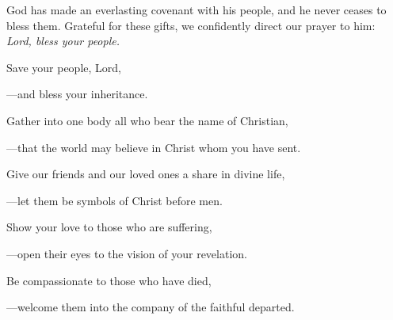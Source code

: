\intercessions\indent

\begin{hangpar}

God has made an everlasting covenant with his people, and he never ceases to bless them. Grateful for these gifts, we confidently direct our prayer to him:\\
\emph{Lord, bless your people.}

\medskip Save your people, Lord,

{\color{red}---\thinspace}and bless your inheritance.

\medskip Gather into one body all who bear the name of Christian,

{\color{red}---\thinspace}that the world may believe in Christ whom you have sent.

\medskip Give our friends and our loved ones a share in divine life,

{\color{red}---\thinspace}let them be symbols of Christ before men.

\medskip Show your love to those who are suffering,

{\color{red}---\thinspace}open their eyes to the vision of your revelation.

\medskip Be compassionate to those who have died,

{\color{red}---\thinspace}welcome them into the company of the faithful departed.

\end{hangpar}

